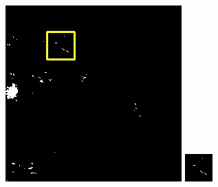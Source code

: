 \documentclass[10pt]{ctexart}
\begin{document}
\begin{multicols}{2}
\begin{figure}[H]
{\begin{minipage}[b]{0.15\linewidth}
            \includegraphics[width=1\linewidth]{../log/spoon2/cut2/LC81620432014072LGN00_16329_my.jpg}\vspace{4pt}
            \includegraphics[width=1\linewidth]{../log/spoon2/cut2/tmp_cut_LC81620432014072LGN00_16329_my.jpg}\vspace{4pt}

\end{minipage}}
\end{figure}
\end{multicols}
\end{document}
